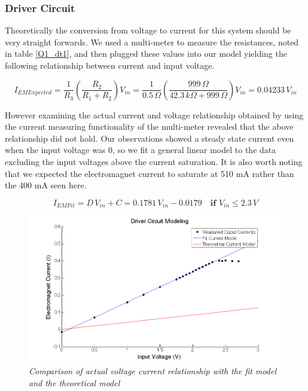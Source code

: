 \documentclass{article}
\theoremstyle{plain}
\theoremstyle{definition}
\theoremstyle{remark}
\begin{document}
\subsubsection*{Driver Circuit}

Theoretically the conversion from voltage to current for this system should be very straight forwards.  We used a multi-meter to measure the resistances, noted in table \ref{Q1_dt1}, and then plugged these values into our model yielding the following relationship between current and input voltage.

$$ I_{EM Expected}=\frac{1}{R_3}\left(\frac{R_2}{R_1+R_2}\right)V_{in} = \frac{1}{0.5 \,\Omega}\left(\frac{999 \,\Omega}{42.3 \,k\Omega + 999 \,\Omega}\right)V_{in} = 0.04233 \, V_{in}$$

However examining the actual current and voltage relationship obtained by using the current measuring functionality of the multi-meter revealed that the above relationship did not hold.  Our observations showed a steady state current even when the input voltage was 0, so we fit a general linear model to the data excluding the input voltages above the current saturation.  It is also worth noting that we expected the electromagnet current to saturate at 510 mA rather than the 400 mA seen here.

$$ I_{EM Fit} = D \, V_{in} + C = 0.1781 \, V_{in} - 0.0179  \quad \textbf{if } V_{in} \leq 2.3 \, V $$

\begin{figure}
\begin{center}
\includegraphics[width = 13cm]{DriverCircuitModel.png}
\end{center}
\label{Q1_d2}
\caption{\emph{Comparison of actual voltage current relationship with the fit model and the theoretical model}}
\end{figure}
\end{document}
